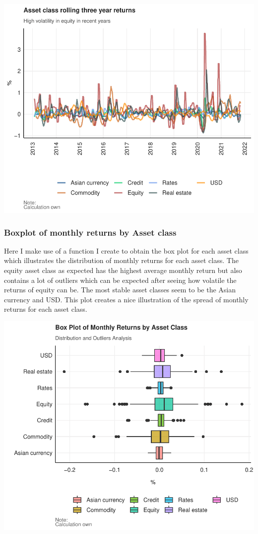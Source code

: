 \documentclass[11pt,preprint, authoryear]{elsarticle}
\numberwithin{equation}{section}
\numberwithin{figure}{section}
\numberwithin{table}{section}
\begin{document}
\includegraphics{Question-6_files/figure-latex/unnamed-chunk-7-1.pdf}

\hypertarget{boxplot-of-monthly-returns-by-asset-class}{%
\subsubsection{Boxplot of monthly returns by Asset
class}\label{boxplot-of-monthly-returns-by-asset-class}}

Here I make use of a function I create to obtain the box plot for each
asset class which illustrates the distribution of monthly returns for
each asset class. The equity asset class as expected has the highest
average monthly return but also contains a lot of outliers which can be
expected after seeing how volatile the returns of equity can be. The
most stable asset classes seem to be the Asian currency and USD. This
plot creates a nice illustration of the spread of monthly returns for
each asset class.

\includegraphics{Question-6_files/figure-latex/unnamed-chunk-8-1.pdf}
\end{document}

